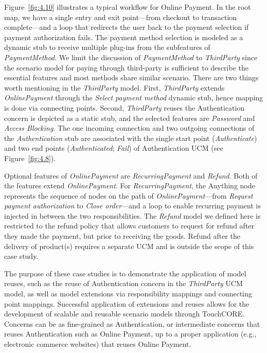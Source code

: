 Figure~\ref{fig:4.10} illustrates a typical workflow for Online Payment. In the root map, we have a single entry and exit point---from checkout to transaction complete---and a loop that redirects the user back to the payment selection if payment authorization fails. The payment method selection is modeled as a dynamic stub to receive multiple plug-ins from the subfeatures of \emph{PaymentMethod}. We limit the discussion of \emph{PaymentMethod} to \emph{ThirdParty} since the scenario model for paying through third-party is sufficient to describe the essential features and most methods share similar scenario. There are two things worth mentioning in the \emph{ThirdParty} model. First, \emph{ThirdParty} extends \emph{OnlinePayment} through the \emph{Select payment method} dynamic stub, hence mapping is done via connecting points. Second, \emph{ThirdParty} reuses the Authentication concern is depicted as a static stub, and the selected features are \emph{Password} and \emph{Access Blocking}. The one incoming connection and two outgoing connections of the \emph{Authentication} stub are associated with the single start point (\emph{Authenticate}) and two end points (\emph{Authenticated}; \emph{Fail}) of Authentication UCM (see Figure~\ref{fig:4.8}).

Optional features of \emph{OnlinePayment} are \emph{RecurringPayment} and \emph{Refund}. Both of the features extend \emph{OnlinePayment}. For \emph{RecurringPayment}, the {\cls Anything} node represents the sequence of nodes on the path of \emph{OnlinePayment}---from \emph{Request payment authorization} to \emph{Close order}---and a loop to enable recurring payment is injected in between the two responsibilities. The \emph{Refund} model we defined here is restricted to the refund policy that allows customers to request for refund after they made the payment, but prior to receiving the goods. Refund after the delivery of product(s) requires a separate UCM and is outside the scope of this case study.

The purpose of these case studies is to demonstrate the application of model reuses, such as the reuse of Authentication concern in the \emph{ThirdParty} UCM model, as well as model extensions via responsibility mappings and connecting point mappings. Successful application of extensions and reuses allows for the development of scalable and reusable scenario models through TouchCORE. Concerns can be as fine-grained as Authentication, or intermediate concerns that reuses Authentication such as Online Payment, up to a proper application (e.g., electronic commerce websites) that reuses Online Payment.

